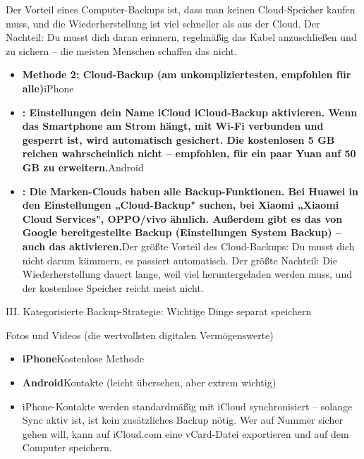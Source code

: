 


Der Vorteil eines Computer-Backups ist, dass man keinen Cloud-Speicher kaufen muss, und die Wiederherstellung ist viel schneller als aus der Cloud. Der Nachteil: Du musst dich daran erinnern, regelmäßig das Kabel anzuschließen und zu sichern – die meisten Menschen schaffen das nicht.

\begin{itemize}
  \item \textbf{Methode 2: Cloud-Backup (am unkompliziertesten, empfohlen für alle)}iPhone
  \item \textbf{: Einstellungen dein Name iCloud iCloud-Backup aktivieren. Wenn das Smartphone am Strom hängt, mit Wi-Fi verbunden und gesperrt ist, wird automatisch gesichert. Die kostenlosen 5 GB reichen wahrscheinlich nicht – empfohlen, für ein paar Yuan auf 50 GB zu erweitern.}Android
  \item \textbf{: Die Marken-Clouds haben alle Backup-Funktionen. Bei Huawei in den Einstellungen „Cloud-Backup" suchen, bei Xiaomi „Xiaomi Cloud Services", OPPO/vivo ähnlich. Außerdem gibt es das von Google bereitgestellte Backup (Einstellungen System Backup) – auch das aktivieren.}Der größte Vorteil des Cloud-Backups: Du musst dich nicht darum kümmern, es passiert automatisch. Der größte Nachteil: Die Wiederherstellung dauert lange, weil viel heruntergeladen werden muss, und der kostenlose Speicher reicht meist nicht.
\end{itemize}

III. Kategorisierte Backup-Strategie: Wichtige Dinge separat speichern


Fotos und Videos (die wertvollsten digitalen Vermögenswerte)


\begin{itemize}
  \item \textbf{iPhone}Kostenlose Methode
  \item \textbf{Android}Kontakte (leicht übersehen, aber extrem wichtig)
  \item iPhone-Kontakte werden standardmäßig mit iCloud synchronisiert – solange Sync aktiv ist, ist kein zusätzliches Backup nötig. Wer auf Nummer sicher gehen will, kann auf iCloud.com eine vCard-Datei exportieren und auf dem Computer speichern.
\end{itemize}

